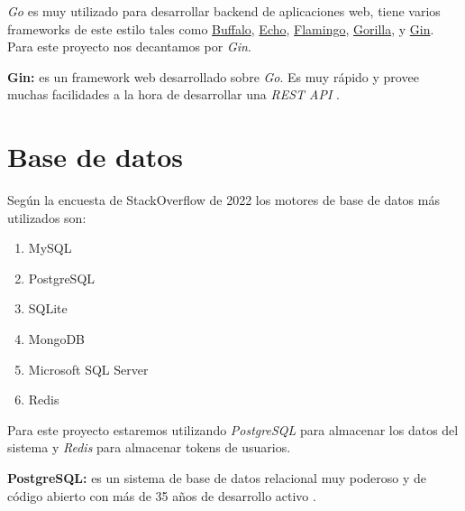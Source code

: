 \textit{Go} es muy utilizado para desarrollar backend de aplicaciones web, tiene varios frameworks de este estilo tales como \href{https://gobuffalo.io/en/}{Buffalo}, \href{https://echo.labstack.com/}{Echo}, \href{https://www.flamingo.me/}{Flamingo}, \href{http://www.gorillatoolkit.org/}{Gorilla}, y \href{https://gin-gonic.com/}{Gin}. Para este proyecto nos decantamos por \textit{Gin}.
\newline

\textbf{Gin:} es un framework web desarrollado sobre \textit{Go}. Es muy rápido y provee muchas facilidades a la hora de desarrollar una \textit{REST API} \cite{gin}.

\section{Base de datos}
Según la encuesta de StackOverflow de 2022 \cite{encuesta2022} los motores de base de datos más utilizados son:
\begin{enumerate}
	\item MySQL
	\item PostgreSQL
	\item SQLite
	\item MongoDB
	\item Microsoft SQL Server
	\item Redis
\end{enumerate}
\newline

Para este proyecto estaremos utilizando \textit{PostgreSQL} para almacenar los datos del sistema y \textit{Redis} para almacenar tokens de usuarios.
\newline

\textbf{PostgreSQL:} es un sistema de base de datos relacional muy poderoso y de código abierto con más de 35 años de desarrollo activo \cite{postgres}.